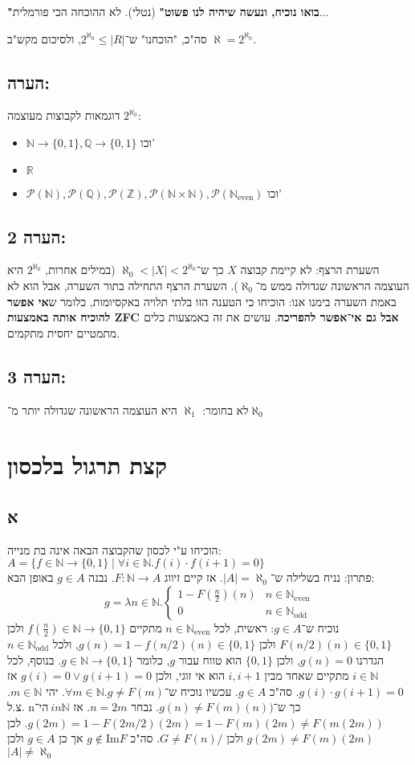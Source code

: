 \documentclass[]{article}
\newcommand\N     {\mathbb{N}}
\newcommand\Z     {\mathbb{Z}}
\newcommand\R     {\mathbb{R}}
\newcommand\Q     {\mathbb{Q}}
\newcommand\ps    {\mathcal{P}}
\newcommand\Neven {\N_{\mathrm{even}}}
\newcommand\Nodd  {\N_{\mathrm{odd }}}
\newcommand\Img   {\text{Im}}
\newcommand\az    {\aleph_0}
\newcommand\anz   {\aleph}
\newcommand\azz   {2^{\aleph_0}}
\newcommand\n     {$n$־יה\ }
\begin{document}
	\textbf{"בואו נוכיח, ונעשה שיהיה לנו פשוט"} (נטלי). לא ההוכחה הכי פורמלית...
	
	סה"כ, "הוכחנו" ש־$ \azz \le |R| $, ולסיכום מקש"ב $ \anz = \azz $. 
	
	\subsection*{הערה: }
	דוגמאות לקבוצות מעוצמה $ \azz $: 
	\begin{itemize}
		\item $ \N \to \{0, 1\}, \Q\to \{0, 1\} $ וכו'
		\item $ \R $
		\item $ \ps(\N), \ps(\Q), \ps(\Z), \ps(\N \times \N), \ps(\Neven) $ וכו'
	\end{itemize}
	
	\subsection*{הערה 2: }
	השערת הרצף: לא קיימת קבוצה $ X $ כך ש־$ \az < |X| < \azz $ (במילים אחרות, $ \azz $ היא העוצמה הראשונה שגדולה ממש מ־$ \az $). 
	השערת הרצף התחילה בתור השערה, אבל הוא לא באמת השערה בימנו אנו: הוכיחו כי הטענה הזו בלתי תלויה באקסיומות, כלומר ש\textbf{אי אפשר להוכיח אותה באמצעות ZFC אבל גם אי־אפשר להפריכה}. עושים את זה באמצעות כלים מתמטיים יחסית מתקמים. 
	\subsection*{הערה 3: }
	לא בחומר: $ \anz_1 $ היא העוצמה הראשונה שגדולה יותר מ־$ \az $
	\section*{קצת תרגול בלכסון}
	\subsection*{א}
	הוכיחו ע"י לכסון שהקבוצה הבאה אינה בת מנייה: 
	$ A = \{f \in \N \to \{0, 1\} \mid \forall i \in \N. f(i) \cdot f(i + 1) = 0\} $ \\
	פתרון: נניח בשלילה ש־$ |A| = \az $. אז קיים זיווג $ F \colon \N\to A $. נבנה $ g \in A $ באופן הבא: 
	\[ g = \lambda n \in \N. \begin{cases}
		1 - F\left (\tfrac{n}{2} \right )(n) &n \in \Neven \\
		0 &n \in \Nodd
	\end{cases} \]
	נוכיח ש־$ g \in A $: ראשית, לכל $ n \in \Neven $ מתקיים $ f(\tfrac{n}{2}) \in \N \to \{0, 1\} $ ולכן $ F(n/2)(n) \in \{0, 1\} $ ולכן $ g(n) = 1 - f(n/2)(n) \in \{0, 1\} $, ולכל $ n \in \Nodd $ הגדרנו $ g(n) = 0 $, ולכן $ \{0, 1\} $ הוא טווח עבור $ g $, כלומר $ g \in \N \to \{0, 1\} $. בנוסף, לכל $ i \in \N $ מתקיים שאחד מבין $ i, i + 1 $ הוא אי זוגי, ולכן $ g(i) = 0 \lor g( i + 1 ) = 0 $ אז $ g(i) \cdot g(i + 1) = 0 $. סה"כ $ g \in A $. עכשיו נוכיח ש־$ \forall m \in \N. g \neq F(m) $. יהי $ m \in \N $. צ.ל. $  \n in \N $ כך ש־$ g(n) \neq F(m)(n)) $. נבחר $ n = 2m $. אז $ g(2m) = 1 - F(2m / 2)(2m) = 1 - F(m)(2m) \neq F(m(2m))$. לכן $ g(2m) \neq F(m)(2m) $ ולכן $ G \neq F(n)/ $. סה"כ $ g \not\in \Img F $ אך כן $ g \in A $ ולכן $ |A| \neq \az $
\end{document}
